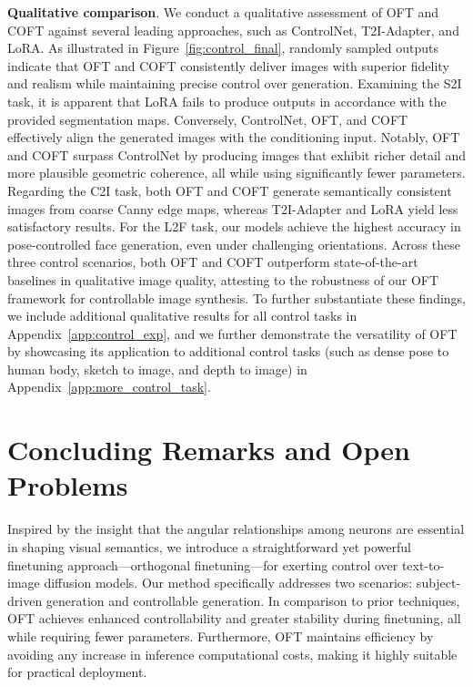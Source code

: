 \textbf{Qualitative comparison}. We conduct a qualitative assessment of OFT and COFT against several leading approaches, such as ControlNet, T2I-Adapter, and LoRA. As illustrated in Figure~\ref{fig:control_final}, randomly sampled outputs indicate that OFT and COFT consistently deliver images with superior fidelity and realism while maintaining precise control over generation. Examining the S2I task, it is apparent that LoRA fails to produce outputs in accordance with the provided segmentation maps. Conversely, ControlNet, OFT, and COFT effectively align the generated images with the conditioning input. Notably, OFT and COFT surpass ControlNet by producing images that exhibit richer detail and more plausible geometric coherence, all while using significantly fewer parameters. Regarding the C2I task, both OFT and COFT generate semantically consistent images from coarse Canny edge maps, whereas T2I-Adapter and LoRA yield less satisfactory results. For the L2F task, our models achieve the highest accuracy in pose-controlled face generation, even under challenging orientations. Across these three control scenarios, both OFT and COFT outperform state-of-the-art baselines in qualitative image quality, attesting to the robustness of our OFT framework for controllable image synthesis. To further substantiate these findings, we include additional qualitative results for all control tasks in Appendix~\ref{app:control_exp}, and we further demonstrate the versatility of OFT by showcasing its application to additional control tasks (such as dense pose to human body, sketch to image, and depth to image) in Appendix~\ref{app:more_control_task}.

\section{Concluding Remarks and Open Problems}

Inspired by the insight that the angular relationships among neurons are essential in shaping visual semantics, we introduce a straightforward yet powerful finetuning approach—orthogonal finetuning—for exerting control over text-to-image diffusion models. Our method specifically addresses two scenarios: subject-driven generation and controllable generation. In comparison to prior techniques, OFT achieves enhanced controllability and greater stability during finetuning, all while requiring fewer parameters. Furthermore, OFT maintains efficiency by avoiding any increase in inference computational costs, making it highly suitable for practical deployment.

